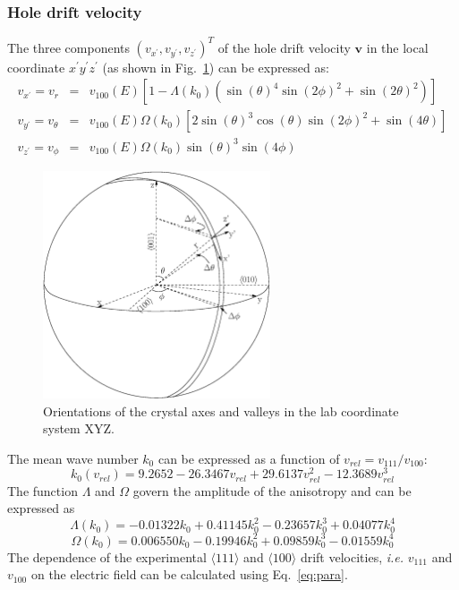 \subsubsection{Hole drift velocity}
\label{sec:hole}
The three components $(v_{x^{\prime}}, v_{y^{\prime}}, v_{z^{\prime}})^{T}$ of the hole drift velocity $\mathbf{v}$ in the local coordinate $x^{\prime}y^{\prime}z^{\prime}$ (as shown in Fig.~\ref{fig:vsphere}) can be expressed as:
\begin{equation}
  \label{eq:vsphere}
  \begin{array}{rcl}
   v_{x^{\prime}} = v_{r} &=& v_{100}(E)[1-\Lambda(k_{0})(\sin(\theta)^{4}\sin(2\phi)^{2} + \sin(2\theta)^{2})]\\
   v_{y^{\prime}} = v_{\theta} &=& v_{100}(E)\Omega(k_{0})[2\sin(\theta)^{3}\cos(\theta)\sin(2\phi)^{2} + \sin(4\theta)]\\
    v_{z^{\prime}} = v_{\phi} &=& v_{100}(E)\Omega(k_{0})\sin(\theta)^{3}\sin(4\phi)
  \end{array}
\end{equation}
\begin{figure}[tbhp]
  \centering
  \includegraphics[width=0.6\textwidth]{vsphere.eps}  
  \caption{Orientations of the crystal axes and valleys in the lab
coordinate system XYZ.}
  \label{fig:vsphere}
\end{figure}
The mean wave number $k_{0}$ can be expressed as a function of $v_{rel} = v_{111}/v_{100}$:
\begin{equation}
  \label{eq:k0}
   k_{0}(v_{rel}) = 9.2652 - 26.3467v_{rel} + 29.6137v_{rel}^{2} - 12.3689v_{rel}^{3}
\end{equation}
The function $\Lambda$ and $\Omega$ govern the amplitude of the anisotropy and can be expressed as
\begin{equation}
  \label{eq:lamb}
   \Lambda(k_{0}) = -0.01322k_{0} + 0.41145k_{0}^{2} - 0.23657k_{0}^{3} + 0.04077k_{0}^{4}
\end{equation}
\begin{equation}
  \label{eq:ome}
   \Omega(k_{0}) = 0.006550k_{0} - 0.19946k_{0}^{2} + 0.09859k_{0}^{3} - 0.01559k_{0}^{4}
\end{equation}
The dependence of the experimental $\langle111\rangle$ and $\langle100\rangle$ drift velocities, \textit{i.e.} $v_{111}$ and $v_{100}$ on the electric field can be calculated using Eq.~\ref{eq:para}.

